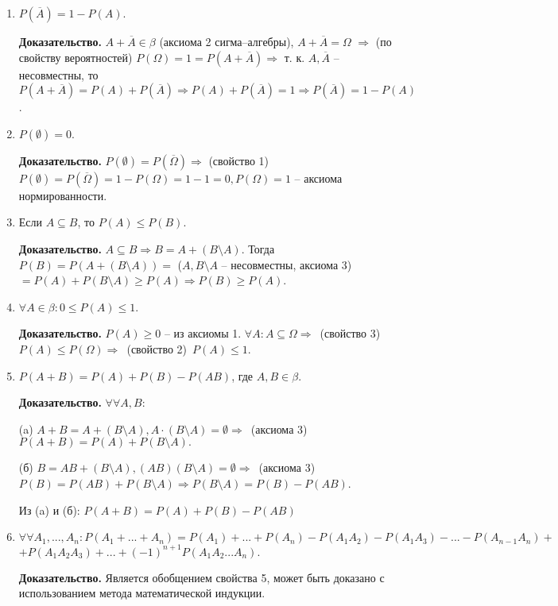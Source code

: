 \begin{enumerate}
	\item $P(\overline{A}) = 1 - P(A)$.
	
	\textbf{Доказательство.} $A + \overline{A} \in \beta$ (аксиома 2 сигма--алгебры), $A + \overline{A} = \Omega$ $\Rightarrow$ (по свойству вероятностей) $P(\Omega) = 1 = P(A + \overline{A}) \Rightarrow$ т. к. $A, \overline{A}$ -- несовместны, то $P(A + \overline{A}) = P(A) + P(\overline{A}) \Rightarrow P(A) + P(\overline{A}) = 1 \Rightarrow P(\overline{A}) = 1 - P(A)$.
	
	\item $P(\emptyset) = 0$.
	
	\textbf{Доказательство.} $P(\emptyset) = P(\overline{\Omega}) \Rightarrow$ (свойство 1)  $P(\emptyset) = P(\overline{\Omega}) = 1 - P(\Omega) = 1 - 1 = 0, P(\Omega) = 1$ -- аксиома нормированности.
	
	\item Если $A \subseteq B$, то $P(A) \leq P(B)$.
	
	\textbf{Доказательство.} $A \subseteq B \Rightarrow B = A + (B \setminus A)$. Тогда $P(B) = P(A + (B \setminus A)) =$ ($A, B \setminus A$ -- несовместны, аксиома 3) $=P(A) + P(B \setminus A) \geq P(A) \Rightarrow P(B) \geq P(A)$.
	
	\item $\forall A \in \beta: 0 \leq P(A) \leq 1$.
	
	\textbf{Доказательство.} $P(A) \geq 0$ -- из аксиомы 1. $\forall A: A \subseteq \Omega \Rightarrow$~(свойство 3)~$P(A) \leq P(\Omega) \Rightarrow$~(свойство 2)~$P(A) \leq 1$.
	
	\item $P(A + B) = P(A) + P(B) - P(AB)$, где $A, B \in \beta$.
	
	\textbf{Доказательство.} $\forall\forall A, B:$ 
	
	(a) $A + B = A + (B \setminus A), A \cdot (B \setminus A) = \emptyset \Rightarrow$~(аксиома 3)~$P(A+B) = P(A) + P(B \setminus A).$  
	
	(б) $B = AB + (B \setminus A), (AB)(B \setminus A) = \emptyset \Rightarrow$~(аксиома 3)~$P(B) = P(AB) + P(B \setminus A) \Rightarrow P(B \setminus A) = P(B) - P(AB)$.
	
	Из (a) и (б): $P(A + B) = P(A) + P(B) - P(AB)$
	
	\item $\forall \forall A_1, ..., A_n: P(A_1 + ... + A_n) = P(A_1) + ... + P(A_n) - P(A_1A_2) - P(A_1A_3) - ... - P(A_{n-1}A_n) +$ $+ P(A_1A_2A_3) + ... + (-1)^{n+1}P(A_1A_2...A_n).$
	
	\textbf{Доказательство.} Является обобщением свойства 5, может быть доказано с использованием метода математической индукции.
\end{enumerate}

